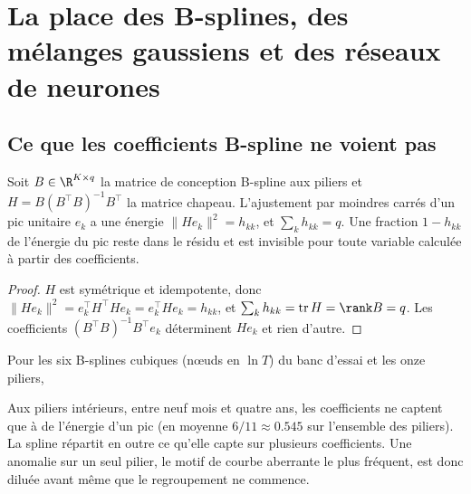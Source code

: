 \section{La place des B-splines, des mélanges gaussiens et des réseaux de neurones}\label{sec-alternatives}

\subsection{Ce que les coefficients B-spline ne voient pas}
\begin{proposition}\label{prop-leverage}
Soit $B\in\R^{K\times q}$ la matrice de conception B-spline aux piliers et $H=B(B^\top B)^{-1}B^\top$ la matrice chapeau.
L'ajustement par moindres carrés d'un pic unitaire $e_k$ a une énergie $\|He_k\|^2=h_{kk}$, et $\sum_kh_{kk}=q$. Une
fraction $1-h_{kk}$ de l'énergie du pic reste dans le résidu et est invisible pour toute variable calculée à partir des
coefficients.
\end{proposition}
\begin{proof}
$H$ est symétrique et idempotente, donc $\|He_k\|^2=e_k^\top H^\top He_k=e_k^\top He_k=h_{kk}$, et
$\sum_kh_{kk}=\operatorname{tr}H=\rank B=q$. Les coefficients $(B^\top B)^{-1}B^\top e_k$ déterminent $He_k$ et rien d'autre.
\end{proof}

\begin{example}
Pour les six B-splines cubiques (nœuds en $\ln T$) du banc d'essai et les onze piliers,
\begin{center}\end{center}
Aux piliers intérieurs, entre neuf mois et quatre ans, les coefficients ne captent que \vLevMin{} à \vLevMax{} de
l'énergie d'un pic (en moyenne $6/11\approx\num{0.545}$ sur l'ensemble des piliers). La spline répartit en outre ce qu'elle
capte sur plusieurs coefficients. Une anomalie sur un seul pilier, le motif de courbe aberrante le plus fréquent, est donc
diluée avant même que le regroupement ne commence.
\end{example}

